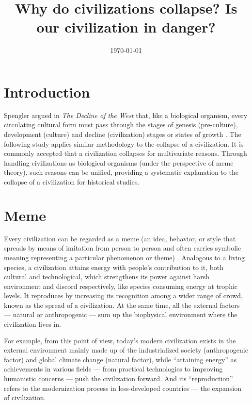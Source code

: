 \documentclass[a4paper,12pt]{article}
\title{Why do civilizations collapse? Is our civilization in danger?}
\author{} %
\date{\today}
\begin{document}
    \maketitle
    \begin{center}
        \doclicenseText
    \end{center}
    \tableofcontents
    \newpage
    
    \section{Introduction}
    
    Spengler argued in \textit{The Decline of the West} that, like a biological organism, every circulating cultural form must pass through the stages of genesis (pre-culture), development (culture) and decline (civilization) stages or states of growth \cite{1926_DeclineOfWest}. 
    The following study applies similar methodology to the collapse of a civilization. 
    It is commonly accepted that a civilization collapses for multivariate reasons.
    Through handling civilizations as biological organisms (under the perspective of meme theory), such reasons can be unified, providing a systematic explanation to the collapse of a civilization for historical studies.
    
    \section{Meme}
    Every civilization can be regarded as a meme (an idea, behavior, or style that spreads by means of imitation from person to person and often carries symbolic meaning representing a particular phenomenon or theme) \cite{2016_TheSelfishGene}.
    Analogous to a living species, a civilization attains energy with people's contribution to it, both cultural and technological, which strengthens its power against harsh environment and discord respectively, like species consuming energy at trophic levels.
    It reproduces by increasing its recognition among a wider range of crowd, known as the spread of a civilization.
    At the same time, all the external factors --- natural or anthropogenic --- sum up the biophysical environment where the civilization lives in.
    
    For example, from this point of view, today's modern civilization exists in the external environment mainly made up of the industrialized society (anthropogenic factor) and global climate change (natural factor), while ``attaining energy'' as achievements in various fields --- from practical technologies to improving humanistic concerns --- push the civilization forward. And its ``reproduction'' refers to the modernization process in less-developed countries --- the expansion of civilization.
    
\end{document}

